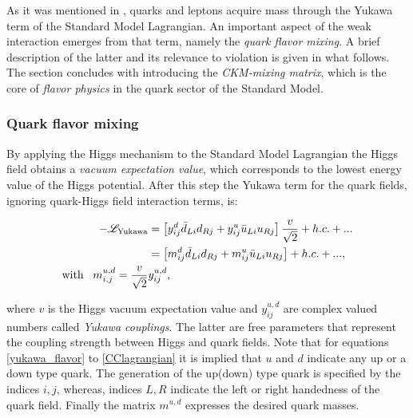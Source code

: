 As it was mentioned in , quarks and leptons acquire mass through the Yukawa term
of the Standard Model Lagrangian. An important aspect of the weak interaction emerges from that term,
namely the {\it quark flavor mixing}. A brief description of the latter and its relevance to \CP violation
is given in what follows. The section concludes with introducing the  {\it CKM-mixing matrix},
which is the core of {\it flavor physics} in the quark sector of the Standard Model.

\subsubsection{Quark flavor mixing}
By applying the Higgs mechanism \cite{PhysRevLett.13.321,PhysRevLett.13.508} to the Standard Model Lagrangian
the Higgs field obtains a {\it vacuum expectation value}, which corresponds to the lowest energy value of the Higgs
potential. After this step the Yukawa term for the quark fields, ignoring quark-Higgs field interaction terms, is:

\begin{subequations}
\label{yukawa_flavor}
\centering
  \begin{align}
  -\mathscr{L}_{\text{Yukawa}} &= \left[ y_{ij}^d \bar{d}_{Li} d_{Rj} + y_{ij}^u \bar{u}_{Li} u_{Rj} \right] \frac{v}{\sqrt{2}} + h.c. + ...  \\
                               &= \left[ m_{ij}^d \bar{d}_{Li} d_{Rj} + m_{ij}^u \bar{u}_{Li} u_{Rj} \right] + h.c. + ...,  \\
                               \text{with} \;\;\; m^{u,d}_{i,j} = \frac{v}{\sqrt{2}} & y_{ij}^{u,d}, \nonumber
  \end{align}
\end{subequations}

\noindent where $v$ is the Higgs vacuum expectation value and $y_{ij}^{u,d}$ are complex valued numbers called {\it Yukawa couplings}.
The latter are free parameters that represent the coupling strength between Higgs and quark fields.
Note that for equations \ref{yukawa_flavor} to \ref{CClagrangian} it is implied that $u$ and $d$ indicate
any up or a down type quark. The generation of the up(down) type quark is specified by the indices $i,j$,
whereas, indices $L,R$ indicate the left or right handedness of the quark field.
Finally the matrix $m^{u,d}$ expresses the desired quark masses.

